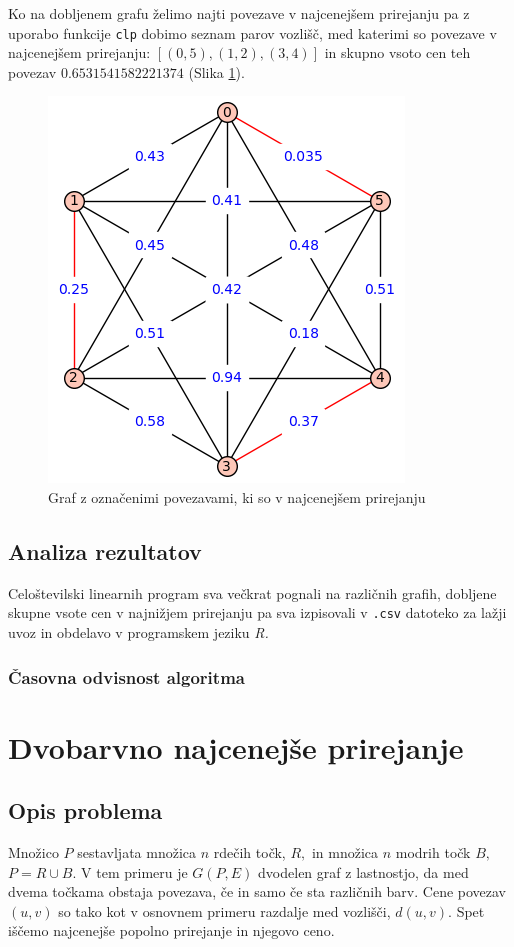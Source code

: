 \documentclass[a4paper, 11pt]{article}
\begin{document}
Ko na dobljenem grafu želimo najti povezave v najcenejšem prirejanju pa z uporabo funkcije \texttt{clp} dobimo
seznam parov vozlišč, med katerimi so povezave v najcenejšem prirejanju: \texttt{$[(0, 5), (1, 2), (3, 4)]$} in skupno vsoto cen teh povezav $0.6531541582221374$ (Slika \ref{fig:graf1clp}).

\begin{figure}[h!]
    \includegraphics[scale=0.7]{graf1clp}
    \centering
    \caption{Graf z označenimi povezavami, ki so v najcenejšem prirejanju}
    \label{fig:graf1clp}
\end{figure}

\subsection{Analiza rezultatov}
Celoštevilski linearnih program sva večkrat pognali na različnih grafih, dobljene skupne vsote cen v najnižjem prirejanju pa sva izpisovali v \texttt{.csv} datoteko za lažji uvoz in obdelavo v programskem jeziku \emph{R.}

\subsubsection*{Časovna odvisnost algoritma}


\section{Dvobarvno najcenejše prirejanje}
\subsection{Opis problema}
Množico $P$ sestavljata množica $n$ rdečih točk, $R,$ in množica $n$ modrih točk $B,$ $P=R \cup B.$
V tem primeru je $G(P,E)$ dvodelen graf z lastnostjo, da med dvema točkama obstaja povezava, če in samo če sta različnih barv.
Cene povezav $(u,v)$ so tako kot v osnovnem primeru razdalje med vozlišči, $d(u,v).$
Spet iščemo najcenejše popolno prirejanje in njegovo ceno.
\end{document}
